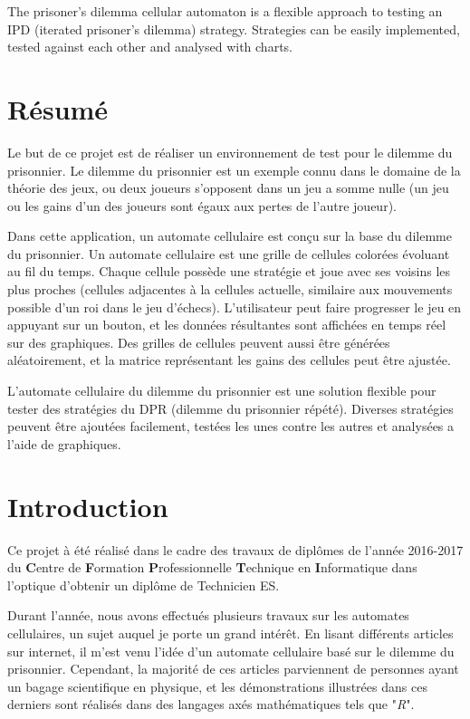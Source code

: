 \documentclass[a4paper, french]{article}
\begin{document}
The prisoner's dilemma cellular automaton is a flexible approach to testing an IPD (iterated prisoner's dilemma) strategy. Strategies can be easily implemented, tested against each other and analysed with charts.


\section{Résumé}
Le but de ce projet est de réaliser un environnement de test pour le dilemme du prisonnier. Le dilemme du prisonnier est un exemple connu dans le domaine de la théorie des jeux, ou deux joueurs s'opposent dans un jeu a somme nulle (un jeu ou les gains d'un des joueurs sont égaux aux pertes de l'autre joueur).

Dans cette application, un automate cellulaire est conçu sur la base du dilemme du prisonnier. Un automate cellulaire est une grille de cellules colorées évoluant au fil du temps. Chaque cellule possède une stratégie et joue avec ses voisins les plus proches (cellules adjacentes à la cellules actuelle, similaire aux mouvements possible d'un roi dans le jeu d'échecs). L'utilisateur peut faire progresser le jeu en appuyant sur un bouton, et les données résultantes sont affichées en temps réel sur des graphiques. Des grilles de cellules peuvent aussi être générées aléatoirement, et la matrice représentant les gains des cellules peut être ajustée.

L'automate cellulaire du dilemme du prisonnier est une solution flexible pour tester des stratégies du DPR (dilemme du prisonnier répété). Diverses stratégies peuvent être ajoutées facilement, testées les unes contre les autres et analysées a l'aide de graphiques.

\pagebreak
\tableofcontents
\pagebreak

\section{Introduction}
Ce projet à été réalisé dans le cadre des travaux de diplômes de l'année 2016-2017 du \textbf{C}entre de \textbf{F}ormation \textbf{P}rofessionnelle \textbf{T}echnique en \textbf{I}nformatique dans l'optique d'obtenir un diplôme de Technicien ES.

Durant l'année, nous avons effectués plusieurs travaux sur les automates cellulaires, un sujet auquel je porte un grand intérêt. En lisant différents articles sur internet, il m'est venu l'idée d'un automate cellulaire basé sur le dilemme du prisonnier. Cependant, la majorité de ces articles parviennent de personnes ayant un bagage scientifique en physique, et les démonstrations illustrées dans ces derniers sont réalisés dans des langages axés mathématiques tels que "\textit{R}". 
\end{document}
